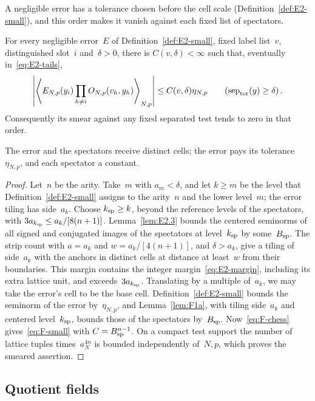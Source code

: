 A negligible error has a tolerance chosen before the cell scale (Definition~\ref{def:E2-small}), and this order makes it vanish against each fixed list of spectators.
\begin{lemma}\label{lem:F1b}
For every negligible error~$E$ of Definition~\ref{def:E2-small}, fixed label list~$v$, distinguished slot~$i$ and~$\delta>0$, there is $C(v,\delta)<\infty$ such that, eventually in~\eqref{eq:E2-tails},
\begin{equation}\label{eq:F-small}
\left|\left\langle E_{N,p}(y_i)\prod_{h\ne i}O_{N,p}(v_h,y_h)\right\rangle_{N,p}\right|
\le C(v,\delta)\eta_{N,p}
\qquad(\operatorname{sep}_{\rm tor}(y)\ge\delta)\,.
\end{equation}
Consequently its smear against any fixed separated test tends to zero in that order.
\end{lemma}
The error and the spectators receive distinct cells; the error pays its tolerance~$\eta_{N,p}$, and each spectator a constant.
\begin{proof}
Let~$n$ be the arity. Take~$m$ with $a_m<\delta$, and let $k\ge m$ be the level that Definition~\ref{def:E2-small} assigns to the arity~$n$ and the lower level~$m$; the error tiling has side~$a_k$. Choose $k_{\rm sp}\ge k$, beyond the reference levels of the spectators, with $3a_{k_{\rm sp}}\le a_k/[8(n+1)]$. Lemma~\ref{lem:E2.3} bounds the centered seminorms of all signed and conjugated images of the spectators at level~$k_{\rm sp}$ by some~$B_{\rm sp}$. The strip count with $a=a_k$ and $w=a_k/[4(n+1)]$, and $\delta>a_k$, give a tiling of side~$a_k$ with the anchors in distinct cells at distance at least~$w$ from their boundaries. This margin contains the integer margin~\eqref{eq:E2-margin}, including its extra lattice unit, and exceeds~$3a_{k_{\rm sp}}$. Translating by a multiple of~$a_k$, we may take the error's cell to be the base cell. Definition~\ref{def:E2-small} bounds the seminorm of the error by~$\eta_{N,p}$, and Lemma~\ref{lem:F1a}, with tiling side~$a_k$ and centered level~$k_{\rm sp}$, bounds those of the spectators by~$B_{\rm sp}$. Now~\eqref{eq:F-chess} gives~\eqref{eq:F-small} with $C=B_{\rm sp}^{n-1}$. On a compact test support the number of lattice tuples times~$a_N^{4n}$ is bounded independently of~$N,p$, which proves the smeared assertion.
\end{proof}

\subsection{Quotient fields}\label{sec:partII-F.3}

